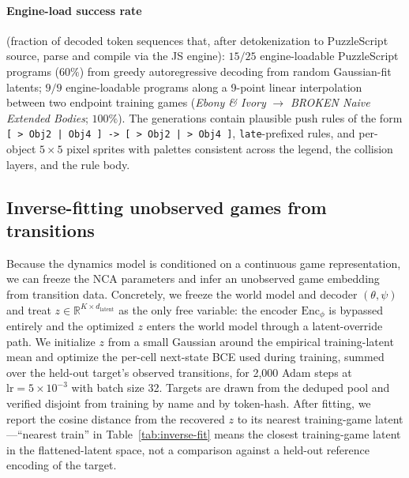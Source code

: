 \paragraph{Engine-load success rate} (fraction of decoded token
sequences that, after detokenization to PuzzleScript source, parse
and compile via the JS engine): $15/25$ engine-loadable PuzzleScript
programs ($60\%$) from greedy autoregressive decoding from random
Gaussian-fit latents; $9/9$ engine-loadable programs along a 9-point
linear interpolation between two endpoint training games
(\textit{Ebony \& Ivory} $\rightarrow$ \textit{BROKEN Naive Extended
Bodies}; $100\%$). The generations contain plausible push rules of
the form
\verb"[ > Obj2 | Obj4 ] -> [ > Obj2 | > Obj4 ]",
\texttt{late}-prefixed rules, and per-object $5{\times}5$ pixel
sprites with palettes consistent across the legend, the collision
layers, and the rule body.

\subsection{Inverse-fitting unobserved games from transitions}
\label{app:inverse-fit}

Because the dynamics model is conditioned on a continuous game
representation, we can freeze the NCA parameters and infer an
unobserved game embedding from transition data. Concretely, we
freeze the world model and decoder $(\theta, \psi)$ and treat
$z \in \mathbb{R}^{K \times d_{\text{latent}}}$ as the only free
variable: the encoder $\mathrm{Enc}_\phi$ is bypassed entirely and
the optimized $z$ enters the world model through a latent-override
path. We initialize $z$ from a small Gaussian around the empirical
training-latent mean and optimize the per-cell next-state BCE used
during training, summed over the held-out target's observed
transitions, for 2{,}000 Adam steps at $\text{lr} = 5 \times 10^{-3}$
with batch size 32. Targets are drawn from the deduped pool and
verified disjoint from training by name and by token-hash. After
fitting, we report the cosine distance from the recovered $z$ to
its nearest training-game latent---``nearest train'' in
Table~\ref{tab:inverse-fit} means the closest training-game latent in
the flattened-latent space, not a comparison against a held-out
reference encoding of the target.

